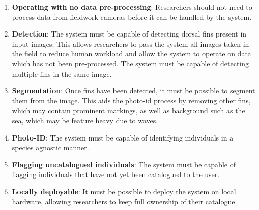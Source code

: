 \begin{enumerate}

\item\textbf{Operating with no data pre-processing}: Researchers should not need to process data from fieldwork cameras before it can be handled by the system. 

\item\textbf{Detection}: The system must be capable of detecting dorsal fins present in input images. This allows researchers to pass the system all images taken in the field to reduce human workload and allow the system to operate on data which has not been pre-processed. The system must be capable of detecting multiple fins in the same image.

\item\textbf{Segmentation}: Once fins have been detected, it must be possible to segment them from the image. This aids the photo-id process by removing other fins, which may contain prominent markings, as well as background such as the sea, which may be feature heavy due to waves.

\item\textbf{Photo-ID}: The system must be capable of identifying individuals in a species agnostic manner.

\item\textbf{Flagging uncatalogued individuals}: The system must be capable of flagging individuals that have not yet been catalogued to the user. 

\item\textbf{Locally deployable}: It must be possible to deploy the system on local hardware, allowing researchers to keep full ownership of their catalogue.

\end{enumerate}

